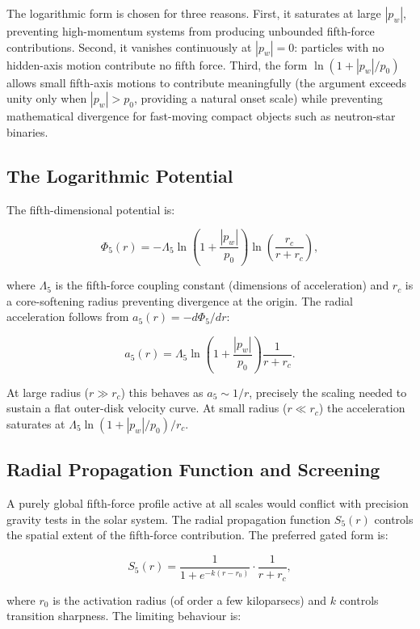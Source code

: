 \documentclass[11pt,a4paper]{article}
\newcommand{\pw}{p_w}                        %
\newcommand{\Lf}{\Lambda_5}                  %
\newcommand{\afiver}{a_5}                    %
\newcommand{\Phifive}{\Phi_5}                %
\newcommand{\Sfive}{S_5}                     %
\begin{document}
\noindent
The logarithmic form is chosen for three reasons.  First, it saturates at
large $|\pw|$, preventing high-momentum systems from producing unbounded
fifth-force contributions.  Second, it vanishes continuously at $|\pw|=0$:
particles with no hidden-axis motion contribute no fifth force.  Third, the
form $\ln(1+|\pw|/p_0)$ allows small fifth-axis motions to contribute
meaningfully (the argument exceeds unity only when $|\pw| > p_0$, providing
a natural onset scale) while preventing mathematical divergence for fast-moving
compact objects such as neutron-star binaries.

\subsection{The Logarithmic Potential}\label{sec:potential}

The fifth-dimensional potential is:

\[
  \Phifive(r) = -\Lf \ln\!\left(1+\frac{|\pw|}{p_0}\right)
  \ln\!\left(\frac{r_c}{r+r_c}\right) ,
\]

where $\Lf$ is the fifth-force coupling constant (dimensions of acceleration)
and $r_c$ is a core-softening radius preventing divergence at the origin.
The radial acceleration follows from $\afiver(r) = -d\Phifive/dr$:

\[
  \afiver(r) = \Lf \ln\!\left(1+\frac{|\pw|}{p_0}\right) \frac{1}{r+r_c} .
\]

At large radius ($r \gg r_c$) this behaves as $\afiver \sim 1/r$, precisely
the scaling needed to sustain a flat outer-disk velocity curve.  At small
radius ($r \ll r_c$) the acceleration saturates at $\Lf\ln(1+|\pw|/p_0)/r_c$.

\subsection{Radial Propagation Function and Screening}\label{sec:screening}

A purely global fifth-force profile active at all scales would conflict with
precision gravity tests in the solar system.  The radial propagation function
$\Sfive(r)$ controls the spatial extent of the fifth-force contribution.  The
preferred gated form is:

\[
  \Sfive(r) = \frac{1}{1+e^{-k(r-r_0)}} \cdot \frac{1}{r+r_c} ,
\]

where $r_0$ is the activation radius (of order a few kiloparsecs) and $k$
controls transition sharpness.  The limiting behaviour is:
\end{document}
